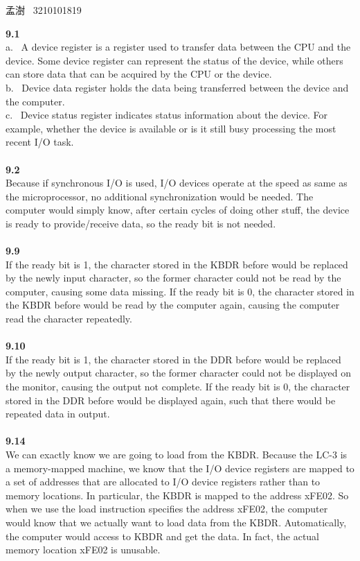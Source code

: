 \documentclass[a4paper,12pt]{article}     %
\begin{document}
\begin{center}   %
孟澍 \ 3210101819
\end{center}


\noindent %
\textbf{9.1}\\
a. \ A device register is a register used to transfer data between the CPU and the device. Some device register can represent the status of the device, while others can store data that can be acquired by the CPU or the device.\\
b. \ Device data register holds the data being transferred between the device and the computer.\\
c. \ Device status register indicates status information about the device. For example, whether the device is available or is it still busy processing the most recent I/O task.\\

~\\
\textbf{9.2}\\
Because if synchronous I/O is used, I/O devices operate at the speed as same as the microprocessor, no additional synchronization would be needed. The computer would simply know, after certain cycles of doing other stuff, the device is ready to provide/receive data, so the ready bit is not needed.\\

~\\
\textbf{9.9}\\
If the ready bit is 1, the character stored in the KBDR before would be replaced by the newly input character, so the former character could not be read by the computer, causing some data missing. If the ready bit is 0, the character stored in the KBDR before would be read by the computer again, causing the computer read the character repeatedly. \\

~\\
\textbf{9.10}\\
If the ready bit is 1, the character stored in the DDR before would be replaced by the newly output character, so the former character could not be displayed on the monitor, causing the output not complete. If the ready bit is 0, the character stored in the DDR before would be displayed again, such that there would be repeated data in output. \\

~\\
\textbf{9.14}\\
We can exactly know we are going to load from the KBDR. Because the LC-3 is a memory-mapped machine, we know that the I/O device registers are mapped to a set of addresses that are allocated to I/O device registers rather than to memory locations. In particular, the KBDR is mapped to the address xFE02. So when we use the load instruction speciﬁes the address xFE02, the computer would know that we actually want to load data from the KBDR. Automatically, the computer would access to KBDR and get the data. In fact, the actual memory location xFE02 is unusable.
\end{document}
